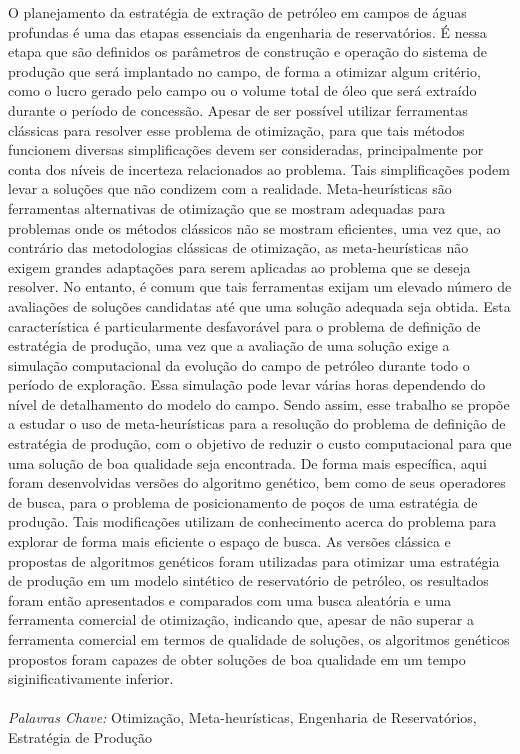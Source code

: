 \documentclass[Portugues,Final]{tese-FT}
\begin{document}
        
        \begin{resumo}
        O planejamento da estratégia de extração de petróleo em campos de águas profundas é uma das etapas essenciais da engenharia de reservatórios. É nessa etapa que são definidos os parâmetros de construção e operação do sistema de produção que será implantado no campo, de forma a otimizar algum critério, como o lucro gerado pelo campo ou o volume total de óleo que será extraído durante o período de concessão. Apesar de ser possível utilizar ferramentas clássicas para resolver esse problema de otimização, para que tais métodos funcionem diversas simplificações devem ser consideradas, principalmente por conta dos níveis de incerteza relacionados ao problema. Tais simplificações podem levar a soluções que não condizem com a realidade. Meta-heurísticas são ferramentas alternativas de otimização que se mostram adequadas para problemas onde os métodos clássicos não se mostram eficientes, uma vez que, ao contrário das metodologias clássicas de otimização, as meta-heurísticas não exigem grandes adaptações para serem aplicadas ao problema que se deseja resolver. No entanto, é comum que tais ferramentas exijam um elevado número de avaliações de soluções candidatas até que uma solução adequada seja obtida. Esta característica é particularmente desfavorável para o problema de definição de estratégia de produção, uma vez que a avaliação de uma solução exige a simulação computacional da evolução do campo de petróleo durante todo o período de exploração. Essa simulação pode levar várias horas dependendo do nível de detalhamento do modelo do campo. Sendo assim, esse trabalho se propõe a estudar o uso de meta-heurísticas para a resolução do problema de definição de estratégia de produção, com o objetivo de reduzir o custo computacional para que uma solução de boa qualidade seja encontrada. De forma mais específica, aqui foram desenvolvidas versões do algoritmo genético, bem como de seus operadores de busca, para o problema de posicionamento de poços de uma estratégia de produção. Tais modificações utilizam de conhecimento acerca do problema para explorar de forma mais eficiente o espaço de busca. As versões clássica e propostas de algoritmos genéticos foram utilizadas para otimizar uma estratégia de produção em um modelo sintético de reservatório de petróleo, os resultados foram então apresentados e comparados com uma busca aleatória e uma ferramenta comercial de otimização, indicando que, apesar de não superar a ferramenta comercial em termos de qualidade de soluções, os algoritmos genéticos propostos foram capazes de obter soluções de boa qualidade em um tempo siginificativamente inferior.
        \\ \\ 
        \textit{Palavras Chave:} Otimização, Meta-heurísticas, Engenharia de Reservatórios, Estratégia de Produção
        \end{resumo}
        
\end{document}
